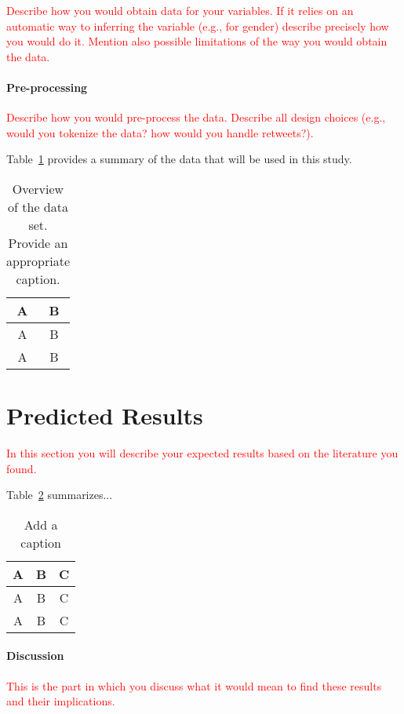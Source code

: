 \documentclass[11pt]{article}
\begin{document}
\textcolor{red}{Describe how you would obtain data for your variables. If it relies on an automatic way to inferring the variable (e.g., for gender) describe precisely how you would do it. Mention also possible limitations of the way you would obtain the data.}

\paragraph{Pre-processing} \textcolor{red}{Describe how you would pre-process the data. Describe all design choices (e.g., would you tokenize the data? how would you handle retweets?).}

Table~\ref{tbl:stats} provides a summary of the data that will be used in this study. 
\begin{table}[hbtp]\centering
\begin{tabular}{|cc|}
\hline
A & B \\
\hline
A & B \\
A & B \\
\hline
\end{tabular}
\caption{Overview of the data set. Provide an appropriate caption.}
\label{tbl:stats}
\end{table}


\section{Predicted Results}

\textcolor{red}{In this section you will describe your expected results based on the literature you found.}

Table~\ref{tbl:results} summarizes...


\begin{table}[hbtp]\centering
\begin{tabular}{|ccc|}
\hline
A & B & C\\
\hline
A & B & C\\
A & B & C\\
\hline
\end{tabular}
\caption{Add a caption}
\label{tbl:results}
\end{table}


\paragraph{Discussion} 

\textcolor{red}{This is the part in which you discuss what it would mean to find these results and their implications.}
\end{document}
